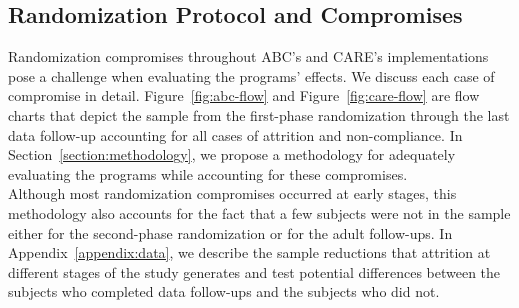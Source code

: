 \begin{appendices}
\subsection{Randomization Protocol and Compromises} \label{appendix:randomization}

\noindent Randomization compromises throughout ABC's and CARE's implementations pose a challenge when evaluating the programs' effects. We discuss each case of compromise in detail. Figure~\ref{fig:abc-flow} and Figure~\ref{fig:care-flow} are flow charts that depict the sample from the first-phase randomization through the last data follow-up accounting for all cases of attrition and non-compliance. In Section~\ref{section:methodology},  we propose a methodology for adequately evaluating the programs while accounting for these compromises.\\

\noindent Although most randomization compromises occurred at early stages, this methodology also accounts for the fact that a few subjects were not in the sample either for the second-phase randomization or for the adult follow-ups. In Appendix~\ref{appendix:data}, we describe the sample reductions that attrition at different stages of the study generates and test potential differences between the subjects who completed data follow-ups and the subjects who did not.\\



\end{appendices}
